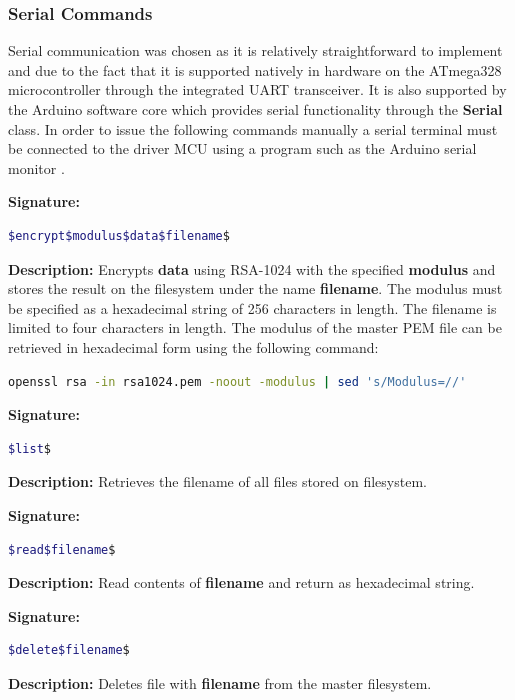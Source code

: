 \subsubsection{Serial Commands}
Serial communication was chosen as it is relatively straightforward to implement and due to the fact that it is supported natively in hardware on the ATmega328 microcontroller through the integrated UART transceiver. It is also supported by the Arduino software core which provides serial functionality through the \textbf{Serial} class. In order to issue the following commands manually a serial terminal must be connected to the driver MCU using a program such as the Arduino serial monitor \cite{serial_monitor}.

\textbf{Signature: } 
\begin{lstlisting}[language=bash]
$encrypt$modulus$data$filename$
\end{lstlisting}
\textbf{Description: }  \linebreak
Encrypts \textbf{data} using RSA-1024 with the specified \textbf{modulus} and stores the result on the filesystem under the name \textbf{filename}. The modulus must be specified as a hexadecimal string of 256 characters in length. The filename is limited to four characters in length. The modulus of the master PEM file can be retrieved in hexadecimal form using the following command:
\begin{lstlisting}[language=bash, frame=none]
openssl rsa -in rsa1024.pem -noout -modulus | sed 's/Modulus=//'
\end{lstlisting}

\textbf{Signature: } 
\begin{lstlisting}[language=bash]
$list$
\end{lstlisting}
\textbf{Description: }  \linebreak
Retrieves the filename of all files stored on filesystem.

\textbf{Signature: } 
\begin{lstlisting}[language=bash]
$read$filename$
\end{lstlisting}
\textbf{Description: }  \linebreak
Read contents of \textbf{filename} and return as hexadecimal string.

\textbf{Signature: } 
\begin{lstlisting}[language=bash]
$delete$filename$
\end{lstlisting}
\textbf{Description: }  \linebreak
Deletes file with \textbf{filename} from the master filesystem.

